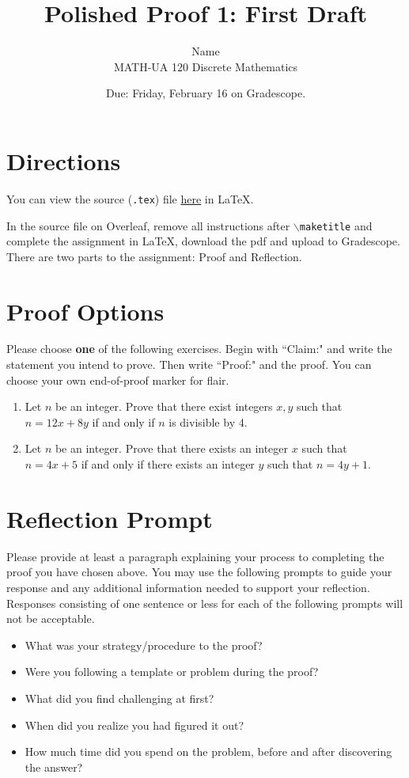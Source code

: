 \documentclass{article}
\title{Polished Proof 1: First Draft}
\author{%
	Name
	\\
	MATH-UA 120 Discrete Mathematics
}
\date{Due: Friday, February 16 on Gradescope.}
\theoremstyle{definition}
\begin{document}
    \maketitle
	
\section*{Directions}
    You can view the source (\texttt{.tex}) file \href{https://bit.ly/3UqVQnS}{here} in \LaTeX.
    
    In the source file on Overleaf, remove all instructions after \texttt{$\backslash$maketitle} and complete the assignment in \LaTeX, 
    download the pdf and upload to Gradescope. There are two parts to the assignment: Proof and Reflection.

\section*{Proof Options}
    Please choose \textbf{one} of the following exercises. Begin with ``Claim:" and write the statement you intend to prove. 
    Then write ``Proof:" and the proof. You can choose your own end-of-proof marker for flair.
    \begin{enumerate}
	\item Let $n$ be an integer. Prove that there exist integers $x, y$ such that \\$n=12x+8y$ if and only if $n$ is divisible by 4.
	\item Let $n$ be an integer. Prove that there exists an integer $x$ such that \\$n=4x+5$ if and only if there exists an integer $y$ such that $n=4y+1$.
    \end{enumerate}

\section*{Reflection Prompt}
    Please provide at least a paragraph explaining your process to completing the proof you have chosen above. You may use the following prompts to guide your response and any additional information needed to support your reflection. Responses consisting of one sentence or less for each of the following prompts will not be acceptable.
    \begin{itemize}
        \item What was your strategy/procedure to the proof?
        \item Were you following a template or problem during the proof?
        \item What did you find challenging at first?
        \item When did you realize you had figured it out?
        \item How much time did you spend on the problem, before and after discovering the answer?
    \end{itemize}
\end{document}
